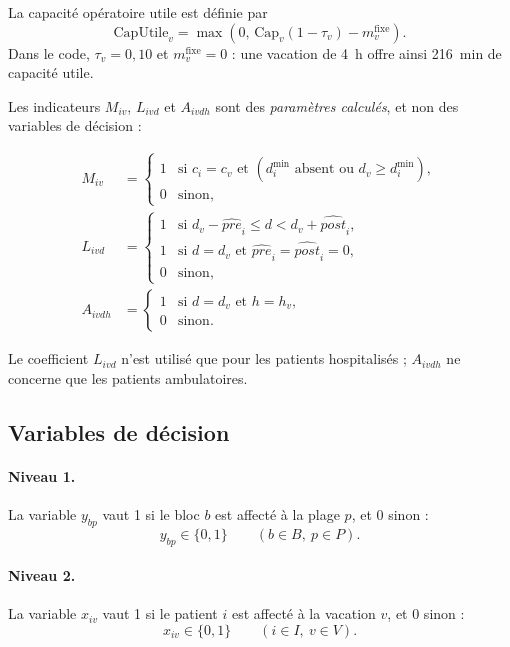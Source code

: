 \documentclass[11pt,a4paper]{article}
\begin{document}
La capacité opératoire utile est définie par
\begin{equation}
\mathrm{CapUtile}_v=\max\!\left(0,\,\mathrm{Cap}_v(1-\tau_v)-m_v^{\mathrm{fixe}}\right).
\label{eq:caputile}
\end{equation}
Dans le code, $\tau_v=0{,}10$ et $m_v^{\mathrm{fixe}}=0$ : une vacation de 4~h offre ainsi 216~min de capacité utile.

Les indicateurs $M_{iv}$, $L_{ivd}$ et $A_{ivdh}$ sont des \emph{paramètres calculés}, et non des variables de décision :

\begin{align}
M_{iv} &=
\begin{cases}
1 & \text{si } c_i=c_v
    \text{ et } (d_i^{\min}\text{ absent ou }d_v\ge d_i^{\min}),\\
0 & \text{sinon},
\end{cases}
\\[4pt]
L_{ivd} &=
\begin{cases}
1 & \text{si } d_v-\widehat{pre}_i
    \le d < d_v+\widehat{post}_i,\\
1 & \text{si } d=d_v
    \text{ et } \widehat{pre}_i=\widehat{post}_i=0,\\
0 & \text{sinon},
\end{cases}
\\[4pt]
A_{ivdh} &=
\begin{cases}
1 & \text{si } d=d_v \text{ et } h=h_v,\\
0 & \text{sinon}.
\end{cases}
\end{align}

Le coefficient $L_{ivd}$ n'est utilisé que pour les patients hospitalisés ; $A_{ivdh}$ ne concerne que les patients ambulatoires.

\subsection{Variables de décision}

\paragraph{Niveau 1.} La variable $y_{bp}$ vaut 1 si le bloc $b$ est affecté à la plage $p$, et 0 sinon :
\begin{equation}
y_{bp}\in\{0,1\}\qquad (b\in B,\ p\in P).
\end{equation}

\paragraph{Niveau 2.} La variable $x_{iv}$ vaut 1 si le patient $i$ est affecté à la vacation $v$, et 0 sinon :
\begin{equation}
x_{iv}\in\{0,1\}\qquad (i\in I,\ v\in V).
\end{equation}
\end{document}
